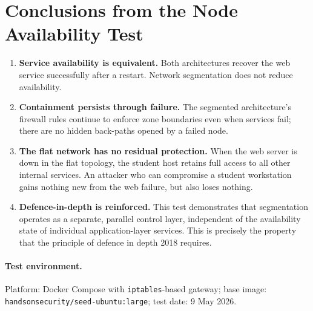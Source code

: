 \section{Conclusions from the Node Availability Test}

\begin{enumerate}[leftmargin=*]
    \item \textbf{Service availability is equivalent.} Both architectures recover the web service successfully after a restart. Network segmentation does not reduce availability.
    \item \textbf{Containment persists through failure.} The segmented architecture's firewall rules continue to enforce zone boundaries even when services fail; there are no hidden back-paths opened by a failed node.
    \item \textbf{The flat network has no residual protection.} When the web server is down in the flat topology, the student host retains full access to all other internal services. An attacker who can compromise a student workstation gains nothing new from the web failure, but also loses nothing.
    \item \textbf{Defence-in-depth is reinforced.} This test demonstrates that segmentation operates as a separate, parallel control layer, independent of the availability state of individual application-layer services. This is precisely the property that the principle of defence in depth \parencite{NCSC}{2018} requires.
\end{enumerate}

\paragraph{Test environment.} Platform: Docker Compose with \texttt{iptables}-based gateway; base image: \texttt{handsonsecurity/seed-ubuntu:large}; test date: 9 May 2026.

